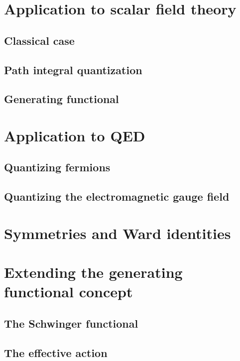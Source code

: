 \documentclass[12pt]{memoir}
\begin{document}
\section{Application to scalar field theory}

\subsection{Classical case}

\subsection{Path integral quantization}

\subsection{Generating functional}

\section{Application to QED}

\subsection{Quantizing fermions}

\subsection{Quantizing the electromagnetic gauge field}

\section{Symmetries and Ward identities}

\section{Extending the generating functional concept}

\subsection{The Schwinger functional}

\subsection{The effective action}
\end{document}

